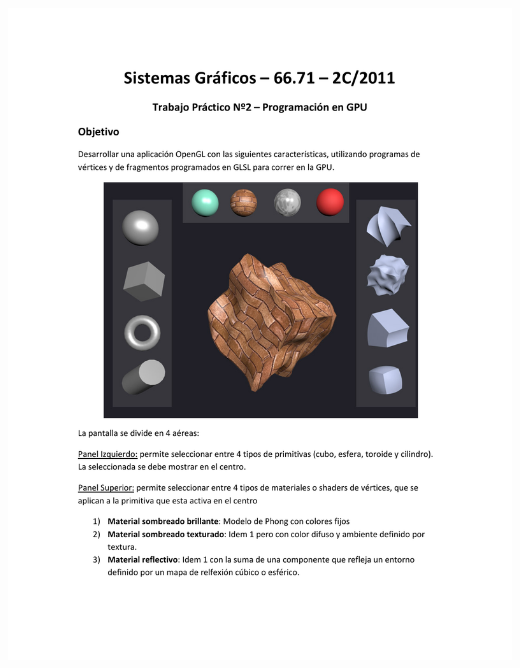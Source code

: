 \documentclass[11pt]{article}
\begin{document}
\begin{center}
\includegraphics[trim = 25mm 30mm 10mm 35mm, clip,height=0.93\textheight,width=1.04\textwidth]{tp2-c2-2011.pdf}

\end{center}
\end{document}
